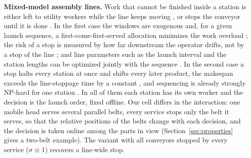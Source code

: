 \documentclass[11pt,a4paper]{article}
\theoremstyle{plain}
\theoremstyle{definition}
\theoremstyle{remark}
\begin{document}
\textbf{Mixed-model assembly lines.} Work that cannot be finished inside a station is
either left to utility workers while the line keeps moving \cite{Yano1991,Tsai1995,Sarker2001},
or stops the conveyor until it is done \cite{Xiaobo2000,Tamura2011}. In the first case the
windows are exogenous and, for a given launch sequence, a first-come-first-served
allocation minimizes the work overload \cite{Yano1991}; the risk of a stop is measured by
how far downstream the operator drifts, not by a stop of the line \cite{Tsai1995}; and line
parameters such as the launch interval and the station lengths can be optimized jointly
with the sequence \cite{Sarker2001}. In the second case a stop halts every station at once
and shifts every later product, the makespan exceeds the line-stoppage time by a constant
\cite{Tamura2011}, and sequencing is already strongly NP-hard for one station
\cite{Tsai1995,Xiaobo2000}. In all of them each station has its own worker and the decision
is the launch order, fixed offline. Our cell differs in the interaction: one mobile head
serves several parallel belts, every service stops only the belt it serves, so that the
relative positions of the belts change with each decision, and the decision is taken online
among the parts in view (Section~\ref{sec:properties} gives a two-belt example). The
variant with all conveyors stopped by every service ($\sigma\equiv1$) recovers a line-wide
stop.
\end{document}
